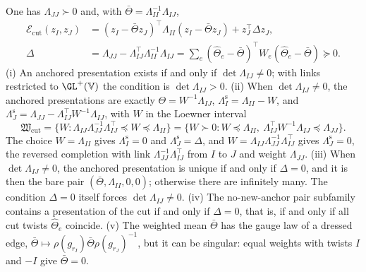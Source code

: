 One has $\Lambda_{JJ}\succ0$ and, with $\bar\Theta=\Lambda_{II}^{-1}\Lambda_{IJ}$,
\begin{align}
\mathcal E_{\mathrm{cut}}(z_I,z_J)&=(z_I-\bar\Theta z_J)^\top\Lambda_{II}(z_I-\bar\Theta z_J)+z_J^\top\Delta z_J,
\label{eq:cg-cut-completed-square}\\
\Delta&=\Lambda_{JJ}-\Lambda_{IJ}^\top\Lambda_{II}^{-1}\Lambda_{IJ}
=\sum_e(\widehat\Theta_e-\bar\Theta)^\top W_e(\widehat\Theta_e-\bar\Theta)\succeq0.
\label{eq:cg-cut-excess}
\end{align}
(i) An anchored presentation exists if and only if $\det\Lambda_{IJ}\neq0$; with links restricted to
$\GL^+(\mathbb V)$ the condition is $\det\Lambda_{IJ}>0$. (ii) When $\det\Lambda_{IJ}\neq0$, the anchored presentations are exactly
$\Theta=W^{-1}\Lambda_{IJ}$, $\Lambda^{\mathrm s}_I=\Lambda_{II}-W$, and
$\Lambda^{\mathrm s}_J=\Lambda_{JJ}-\Lambda_{IJ}^\top W^{-1}\Lambda_{IJ}$, with $W$ in the Loewner interval
\begin{equation}
\mathfrak W_{\mathrm{cut}}=\{W:\Lambda_{IJ}\Lambda_{JJ}^{-1}\Lambda_{IJ}^\top\preceq W\preceq\Lambda_{II}\}
=\{W\succ0:W\preceq\Lambda_{II},\ \Lambda_{IJ}^\top W^{-1}\Lambda_{IJ}\preceq\Lambda_{JJ}\}.
\label{eq:cg-cut-admissible-weights}
\end{equation}
The choice $W=\Lambda_{II}$ gives $\Lambda^{\mathrm s}_I=0$ and $\Lambda^{\mathrm s}_J=\Delta$, and
$W=\Lambda_{IJ}\Lambda_{JJ}^{-1}\Lambda_{IJ}^\top$ gives $\Lambda^{\mathrm s}_J=0$, the reversed completion with
link $\Lambda_{JJ}^{-1}\Lambda_{IJ}^\top$ from $I$ to $J$ and weight $\Lambda_{JJ}$. (iii) When
$\det\Lambda_{IJ}\neq0$, the anchored presentation is unique if and only if $\Delta=0$, and it is then the
bare pair $(\bar\Theta,\Lambda_{II},0,0)$; otherwise there are infinitely many. The condition $\Delta=0$
itself forces $\det\Lambda_{IJ}\neq0$. (iv) The no-new-anchor pair subfamily contains a presentation of the
cut if and only if $\Delta=0$, that is, if and only if all cut twists $\widehat\Theta_e$ coincide. (v) The
weighted mean $\bar\Theta$ has the gauge law of a dressed edge,
$\bar\Theta\mapsto\rho(g_{r_I})\bar\Theta\rho(g_{r_J})^{-1}$, but it can be singular: equal weights with
twists $I$ and $-I$ give $\bar\Theta=0$. 

